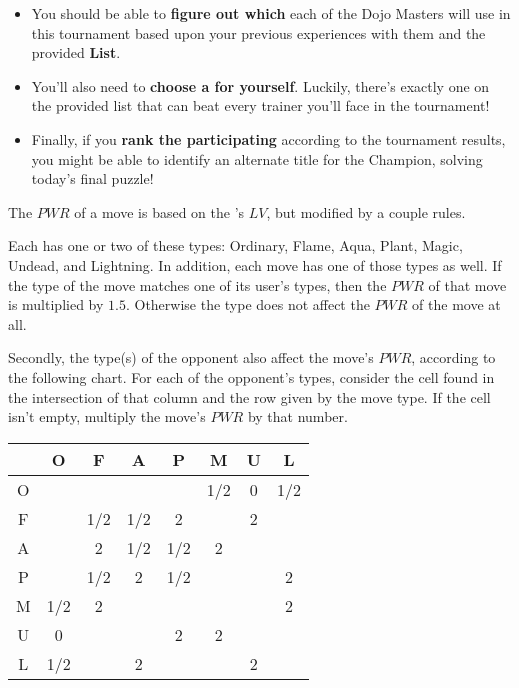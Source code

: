 \begin{itemize}
  \item You should be able to \textbf{figure out which \mappMobimon{}} each of
        the Dojo Masters will use in this tournament
        based upon your previous experiences with them and the provided
        \textbf{\mappMobimon{} List}.
  \item You'll also need to \textbf{choose a \mappMobimon{} for yourself}.
        Luckily, there's exactly one \mappMobimon{} on the provided list that
        can beat every trainer you'll face in the tournament!
  \item Finally, if you \textbf{rank the participating \mappMobimon{}} according
        to the tournament results, you might be able to identify an alternate
        title for the \mappMobimon{} Champion, solving today's final
        puzzle!
\end{itemize}



The \(PWR\) of a \mappMobimon{} move is based on the
\mappMobimon{}'s \(LV\), but modified by a couple rules.

Each \mappMobimon{} has one or two of these types: Ordinary, Flame, Aqua, Plant,
Magic, Undead, and Lightning. In addition, each \mappMobimon{} move has one
of those types as well. If the type of the move matches one of its user's
types, then the \(PWR\) of that move is multiplied by \(1.5\). Otherwise
the \mappMobimon{} type does not affect the \(PWR\) of the move at all.

Secondly, the type(s) of the opponent \mappMobimon{} also affect the move's
\(PWR\), according to the following chart.
For each of the opponent's types, consider the cell found in the
intersection of that column and the row given by the move type. If the cell
isn't empty, multiply the move's \(PWR\) by that number.

\begin{center}
\begin{tabular}{c||c|c|c|c|c|c|c|}
     &  O  &  F  &  A  &  P  &  M  &  U  &  L  \\\hline\hline
  O  &     &     &     &     & 1/2 &  0  & 1/2 \\\hline
  F  &     & 1/2 & 1/2 &  2  &     &  2  &     \\\hline
  A  &     &  2  & 1/2 & 1/2 &  2  &     &     \\\hline
  P  &     & 1/2 &  2  & 1/2 &     &     &  2  \\\hline
  M  & 1/2 &  2  &     &     &     &     &  2  \\\hline
  U  &  0  &     &     &  2  &  2  &     &     \\\hline
  L  & 1/2 &     &  2  &     &     &  2  &     \\\hline
\end{tabular}
\end{center}

